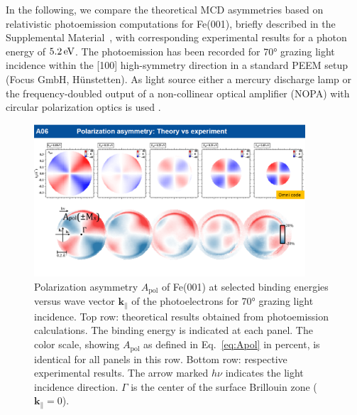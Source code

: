 \documentclass[prl,twocolumn,floatfix]{revtex4-2}
\renewcommand{\vec}[1]{\boldsymbol{#1}}
\begin{document}
In the following, we compare the theoretical MCD asymmetries based on relativistic photoemission computations for Fe(001), briefly described in the Supplemental Material~\cite{Supplement}, with corresponding experimental results for a photon energy of $\unit[5.2]{eV}$. The photoemission has been recorded for 70° grazing light incidence within the [100] high-symmetry direction in a standard PEEM setup (Focus GmbH, Hünstetten). As light source either a mercury discharge lamp or the frequency-doubled output of a non-collinear optical amplifier (NOPA) with circular polarization optics is used \cite{Duncker12,Gillmeister20,Paleschke2021}. 

\begin{figure}
    \centering
    \includegraphics[width = 0.9\textwidth]{Apol}
    \caption{Polarization asymmetry $A_{\mathrm{pol}}$ of Fe(001) at selected binding energies versus wave vector $\vec{k}_{\parallel}$ of the photoelectrons for 70° grazing light incidence. Top row: theoretical results obtained from photoemission calculations. The binding energy is indicated at each panel. The color scale, showing $A_{\mathrm{pol}}$ as defined in Eq.~\eqref{eq:Apol} in percent, is identical for all panels in this row. Bottom row: respective experimental results. The arrow marked $h \nu$ indicates the light incidence direction. $\Gamma$ is the center of the surface Brillouin zone ($\vec{k}_{\parallel} = 0$).}
    \label{fig:Apol}
\end{figure}
\end{document}
